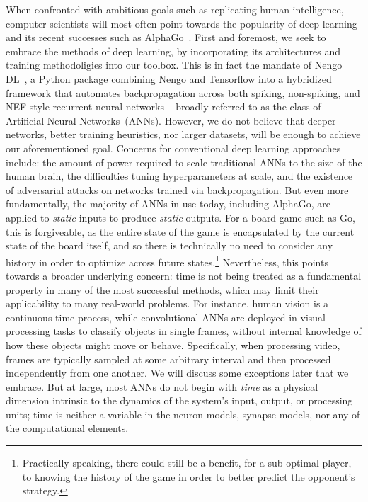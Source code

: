 When confronted with ambitious goals such as replicating human intelligence, computer scientists will most often point towards
the popularity of deep learning~\citep{lecun2015deep} and its recent successes such as AlphaGo~\citep{gibney2016google}.
First and foremost, we seek to embrace the methods of deep learning, by incorporating its architectures and training methodoligies into our toolbox.
This is in fact the mandate of Nengo DL~\citep{rasmussen2018nengodl}, a Python package combining Nengo and Tensorflow into a hybridized framework that automates backpropagation across both spiking, non-spiking, and NEF-style recurrent neural networks -- broadly referred to as the class of Artificial Neural Networks~(ANNs).
However, we do not believe that deeper networks, better training heuristics, nor larger datasets, will be enough to achieve our aforementioned goal.
Concerns for conventional deep learning approaches include: the amount of power required to scale traditional ANNs to the size of the human brain, the difficulties tuning hyperparameters at scale, and the existence of adversarial attacks on networks trained via backpropagation.
But even more fundamentally, the majority of ANNs in use today, including AlphaGo, are applied to \emph{static} inputs to produce \emph{static} outputs.
For a board game such as Go, this is forgiveable, as the entire state of the game is encapsulated by the current state of the board itself, and so there is technically no need to consider any history in order to optimize across future states.\footnote{
Practically speaking, there could still be a benefit, for a sub-optimal player, to knowing the history of the game in order to better predict the opponent's strategy.}
Nevertheless, this points towards a broader underlying concern: time is not being treated as a fundamental property in many of the most successful methods, which may limit their applicability to many real-world problems.
For instance, human vision is a continuous-time process, while convolutional ANNs are deployed in visual processing tasks to classify objects in single frames, without internal knowledge of how these objects might move or behave.
Specifically, when processing video, frames are typically sampled at some arbitrary interval and then processed independently from one another.
We will discuss some exceptions later that we embrace.
But at large, most ANNs do not begin with {\it time} as a physical dimension intrinsic to the dynamics of the system's input, output, or processing units;
time is neither a variable in the neuron models, synapse models, nor any of the computational elements.

